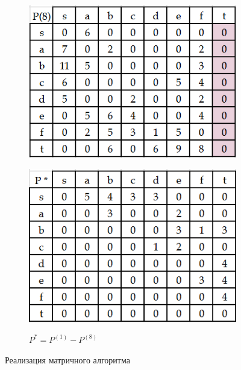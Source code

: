 \documentclass{article}
\begin{document}
\begin{enumerate}
\begin{figure}
\begin{subfigure}[b]{0.3\textwidth}
         \includegraphics[width=\textwidth]{attachments/16/8.png}
         \label{fig:16_8}
     \end{subfigure}
     \hfill
     \begin{subfigure}[b]{0.3\textwidth}
         \centering
         \caption*{\small{$P^* = P^{(1)} - P^{(8)}$}}
         \includegraphics[width=\textwidth]{attachments/16/res.png}
         \label{fig:16_1}
     \end{subfigure}
        \caption{Реализация матричного алгоритма}
        \label{fig:16_matrixes}
\end{figure}
\end{enumerate}
\end{document}
